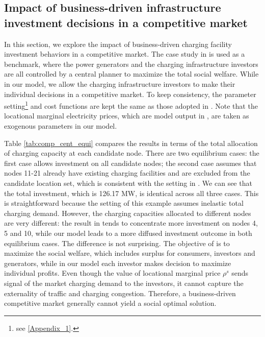 \subsection{Impact of business-driven infrastructure investment decisions in a competitive market} \label{sec:cp_cm}
In this section, we explore the impact of business-driven charging facility investment behaviors in a competitive market.  The case study in \citep{He_et_al_13} is used as a benchmark, where the power generators and the charging infrastructure investors are all controlled by a central planner to maximize the total social welfare.  While in our model, we allow the charging infrastructure investors to make their individual decisions in a competitive market.  To keep consistency, the parameter setting\footnote{see \ref{Appendix_1}.} and cost functions are kept the same as those adopted in \citep{He_et_al_13}.  Note that the locational marginal electricity prices, which are model output in \citep{He_et_al_13}, are taken as exogenous parameters in our model.     

Table \ref{tab:comp_cent_equi} compares the results in terms of the total allocation of charging capacity at each candidate node.  There are two equilibrium cases: the first case allows investment on all candidate nodes; the second case assumes that nodes 11-21 already have existing charging facilities and are excluded from the candidate location set, which is consistent with the setting in \citep{He_et_al_13}.  We can see that the total investment,  which is 126.17 MW, is identical across all three cases.  This is straightforward because the setting of this example assumes inelastic total charging demand. However, the charging capacities allocated to different nodes are very different: the result in\citep{He_et_al_13} tends to concentrate more investment on nodes 4, 5 and 10, while our model leads to a more diffused investment outcome in both equilibrium cases. The difference is not surprising.  The objective of \citep{He_et_al_13} is to maximize the social welfare, which includes surplus for consumers, investors and generators, while in our model each investor makes decision  to maximize individual profits.  Even though the value of locational marginal price $\rho^s$ sends signal of the market charging demand to the investors, it cannot capture the externality of traffic and charging congestion. Therefore, a business-driven competitive market generally cannot yield a social optimal solution. 
 
